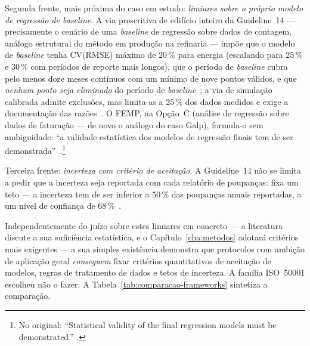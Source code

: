 Segunda frente, mais próxima do caso em estudo: \emph{limiares sobre o próprio modelo de regressão de baseline}. A via prescritiva de edifício inteiro da Guideline~14 --- precisamente o cenário de uma \emph{baseline} de regressão sobre dados de contagem, análogo estrutural do método em produção na refinaria --- impõe que o modelo de \emph{baseline} tenha CV(RMSE) máximo de $20\,\%$ para energia (escalando para $25\,\%$ e $30\,\%$ com períodos de reporte mais longos), que o período de \emph{baseline} cubra pelo menos doze meses contínuos com um mínimo de nove pontos válidos, e que \emph{nenhum ponto seja eliminado} do período de \emph{baseline}~\cite[\S4.3.2.1]{ASHRAE14_2014}; a via de simulação calibrada admite exclusões, mas limita-as a $25\,\%$ dos dados medidos e exige a documentação das razões~\cite[\S4.3.2.4]{ASHRAE14_2014}. O FEMP, na Opção~C (análise de regressão sobre dados de faturação --- de novo o análogo do caso Galp), formula-o sem ambiguidade: \enquote{a validade estatística dos modelos de regressão finais tem de ser demonstrada}~\cite[\S4.4]{FEMP_2015}.\footnote{No original: \enquote{Statistical validity of the final regression models must be demonstrated.} \cite[\S4.4]{FEMP_2015}.}

Terceira frente: \emph{incerteza com critério de aceitação}. A Guideline~14 não se limita a pedir que a incerteza seja reportada com cada relatório de poupanças: fixa um teto --- a incerteza tem de ser inferior a $50\,\%$ das poupanças anuais reportadas, a um nível de confiança de $68\,\%$~\cite[\S4.3.2.4\,h)]{ASHRAE14_2014}.

Independentemente do juízo sobre estes limiares em concreto --- a literatura discute a sua suficiência estatística, e o Capítulo~\ref{cha:metodos} adotará critérios mais exigentes --- a sua simples existência demonstra que protocolos com ambição de aplicação geral \emph{conseguem} fixar critérios quantitativos de aceitação de modelos, regras de tratamento de dados e tetos de incerteza. A família ISO~50001 escolheu não o fazer. A Tabela~\ref{tab:comparacao-frameworks} sintetiza a comparação.

